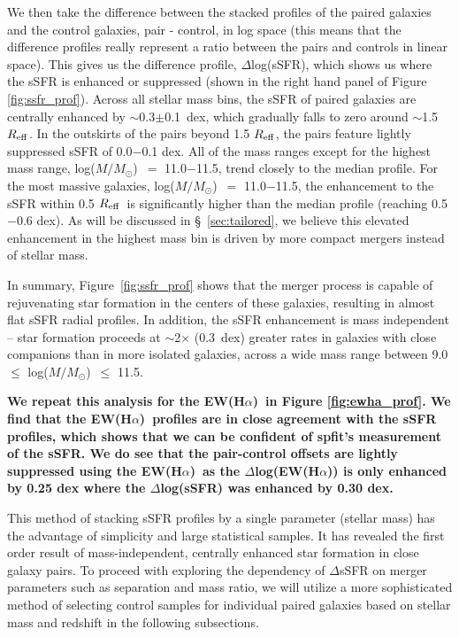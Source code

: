\documentclass[iop,revtex4,twocolumn,apj,numberedappendix,appendixfloats]{emulateapj}
\newcommand{\reff}{$R_{\rm eff}$}
\newcommand{\ewha}{EW(H$\alpha$)}
\newcommand{\logm}{log($M/M_{\odot}$)}
\begin{document}
We then take the difference between the stacked profiles of the paired galaxies and the control galaxies, pair - control, in log space (this means that the difference profiles really represent a ratio between the pairs and controls in linear space). This gives us the difference profile, $\Delta$log(sSFR), which shows us where the sSFR is enhanced or suppressed (shown in the right hand panel of Figure \ref{fig:ssfr_prof}). Across all stellar mass bins, the sSFR of paired galaxies are centrally enhanced by $\sim$0.3$\pm$0.1~dex, which gradually falls to zero around $\sim$1.5 \reff. In the outskirts of the pairs beyond 1.5 \reff, the pairs feature lightly suppressed sSFR of 0.0$-$0.1 dex. All of the mass ranges except for the highest mass range, \logm\ $=$ 11.0$-$11.5, trend closely to the median profile. For the most massive galaxies, \logm\ $=$ 11.0$-$11.5, the enhancement to the sSFR within 0.5 \reff\ is significantly higher than the median profile (reaching 0.5$-$0.6 dex). As will be discussed in \S~\ref{sec:tailored}, we believe this elevated enhancement in the highest mass bin is driven by more compact mergers instead of stellar mass. 

In summary, Figure~\ref{fig:ssfr_prof} shows that the merger process is capable of rejuvenating star formation in the centers of these galaxies, resulting in almost flat sSFR radial profiles. In addition, the sSFR enhancement is mass independent -- star formation proceeds at $\sim$2$\times$ (0.3~dex) greater rates in galaxies with close companions than in more isolated galaxies, across a wide mass range between 9.0 $\leq$ \logm\ $\leq$ 11.5.

\textbf{ 
We repeat this analysis for the \ewha\ in Figure \ref{fig:ewha_prof}. We find that the \ewha\ profiles are in close agreement with the sSFR profiles, which shows that we can be confident of {\sc spfit}'s measurement of the sSFR. We do see that the pair-control offsets are lightly suppressed using the \ewha\ as the $\Delta$log(\ewha) is only enhanced by 0.25 dex where the $\Delta$log(sSFR) was enhanced by 0.30 dex. 
}

This method of stacking sSFR profiles by a single parameter (stellar mass) has the advantage of simplicity and large statistical samples. It has revealed the first order result of mass-independent, centrally enhanced star formation in close galaxy pairs. To proceed with exploring the dependency of $\Delta$sSFR on merger parameters such as separation and mass ratio, we will utilize a more sophisticated method of selecting control samples for individual paired galaxies based on stellar mass and redshift in the following subsections.  
\end{document}
